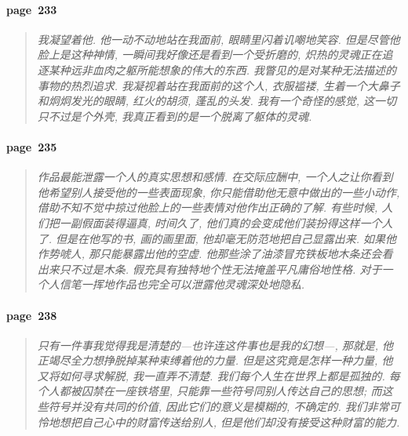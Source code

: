 \paragraph*{page~233}
\begin{quotation}
    \itshape
    我凝望着他. 他一动不动地站在我面前, 眼睛里闪着讥嘲地笑容. 但是尽管他脸上是这种神情, 一瞬间我好像还是看到一个受折磨的, 炽热的灵魂正在追逐某种远非血肉之躯所能想象的伟大的东西. 我瞥见的是对某种无法描述的事物的热烈追求. 我凝视着站在我面前的这个人, 衣服褴褛, 生着一个大鼻子和炯炯发光的眼睛, 红火的胡须, 蓬乱的头发. 我有一个奇怪的感觉, 这一切只不过是个外壳, 我真正看到的是一个脱离了躯体的灵魂. 
\end{quotation}

\paragraph*{page~235}
\begin{quotation}
    \itshape
    作品最能泄露一个人的真实思想和感情. 在交际应酬中, 一个人之让你看到他希望别人接受他的一些表面现象, 你只能借助他无意中做出的一些小动作, 借助不知不觉中掠过他脸上的一些表情对他作出正确的了解. 有些时候, 人们把一副假面装得逼真, 时间久了, 他们真的会变成他们装扮得这样一个人了. 但是在他写的书, 画的画里面, 他却毫无防范地把自己显露出来. 如果他作势唬人, 那只能暴露出他的空虚. 他那些涂了油漆冒充铁板地木条还会看出来只不过是木条. 假充具有独特地个性无法掩盖平凡庸俗地性格. 对于一个人信笔一挥地作品也完全可以泄露他灵魂深处地隐私.
\end{quotation}

\paragraph*{page~238}
\begin{quotation}
    \itshape
    只有一件事我觉得我是清楚的---也许连这件事也是我的幻想---, 那就是, 他正竭尽全力想挣脱掉某种束缚着他的力量. 但是这究竟是怎样一种力量, 他又将如何寻求解脱, 我一直弄不清楚. 我们每个人生在世界上都是孤独的. 每个人都被囚禁在一座铁塔里, 只能靠一些符号同别人传达自己的思想; 而这些符号并没有共同的价值, 因此它们的意义是模糊的, 不确定的. 我们非常可怜地想把自己心中的财富传送给别人, 但是他们却没有接受这种财富的能力. 
\end{quotation}

